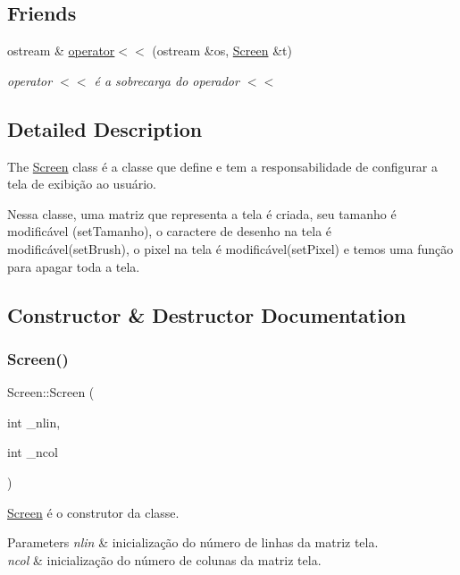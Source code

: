\subsection*{Friends}
\begin{DoxyCompactItemize}
\item 
ostream \& \mbox{\hyperlink{class_screen_aab6a2880746bfe1b7964817cc8f0989e}{operator$<$$<$}} (ostream \&os, \mbox{\hyperlink{class_screen}{Screen}} \&t)
\begin{DoxyCompactList}\small\item\em operator $<$$<$ é a sobrecarga do operador $<$$<$ \end{DoxyCompactList}\end{DoxyCompactItemize}


\subsection{Detailed Description}
The \mbox{\hyperlink{class_screen}{Screen}} class é a classe que define e tem a responsabilidade de configurar a tela de exibição ao usuário. 

Nessa classe, uma matriz que representa a tela é criada, seu tamanho é modificável (set\+Tamanho), o caractere de desenho na tela é modificável(set\+Brush), o pixel na tela é modificável(set\+Pixel) e temos uma função para apagar toda a tela. 

\subsection{Constructor \& Destructor Documentation}
\mbox{\label{class_screen_a6c21beca43d25854d8674445127ef2eb}} 
\subsubsection{\texorpdfstring{Screen()}{Screen()}}
{\footnotesize\ttfamily Screen\+::\+Screen (\begin{DoxyParamCaption}\item[{int}]{\+\_\+nlin,  }\item[{int}]{\+\_\+ncol }\end{DoxyParamCaption})}



\mbox{\hyperlink{class_screen}{Screen}} é o construtor da classe. 


\begin{DoxyParams}{Parameters}
{\em nlin} & inicialização do número de linhas da matriz tela. \\
\hline
{\em ncol} & inicialização do número de colunas da matriz tela. \\
\hline
\end{DoxyParams}



